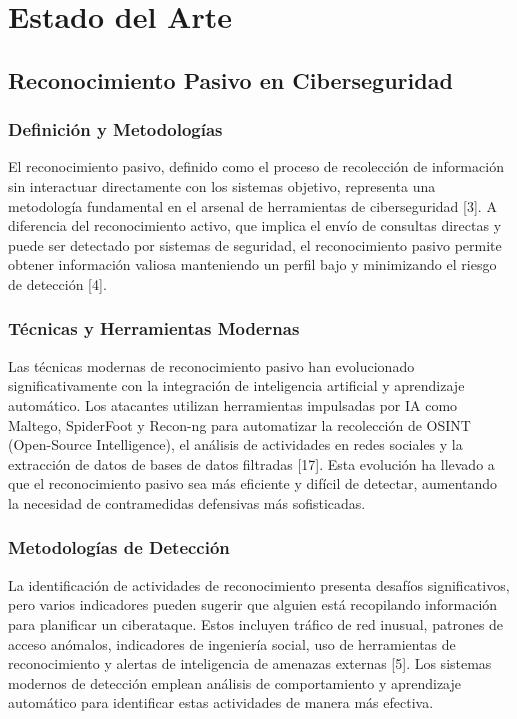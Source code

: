 \section{Estado del Arte}

\subsection{Reconocimiento Pasivo en Ciberseguridad}

\subsubsection{Definición y Metodologías}

El reconocimiento pasivo, definido como el proceso de recolección de información sin interactuar directamente con los sistemas objetivo, representa una metodología fundamental en el arsenal de herramientas de ciberseguridad [3]. A diferencia del reconocimiento activo, que implica el envío de consultas directas y puede ser detectado por sistemas de seguridad, el reconocimiento pasivo permite obtener información valiosa manteniendo un perfil bajo y minimizando el riesgo de detección [4].

\subsubsection{Técnicas y Herramientas Modernas}

Las técnicas modernas de reconocimiento pasivo han evolucionado significativamente con la integración de inteligencia artificial y aprendizaje automático. Los atacantes utilizan herramientas impulsadas por IA como Maltego, SpiderFoot y Recon-ng para automatizar la recolección de OSINT (Open-Source Intelligence), el análisis de actividades en redes sociales y la extracción de datos de bases de datos filtradas [17]. Esta evolución ha llevado a que el reconocimiento pasivo sea más eficiente y difícil de detectar, aumentando la necesidad de contramedidas defensivas más sofisticadas.

\subsubsection{Metodologías de Detección}

La identificación de actividades de reconocimiento presenta desafíos significativos, pero varios indicadores pueden sugerir que alguien está recopilando información para planificar un ciberataque. Estos incluyen tráfico de red inusual, patrones de acceso anómalos, indicadores de ingeniería social, uso de herramientas de reconocimiento y alertas de inteligencia de amenazas externas [5]. Los sistemas modernos de detección emplean análisis de comportamiento y aprendizaje automático para identificar estas actividades de manera más efectiva.

